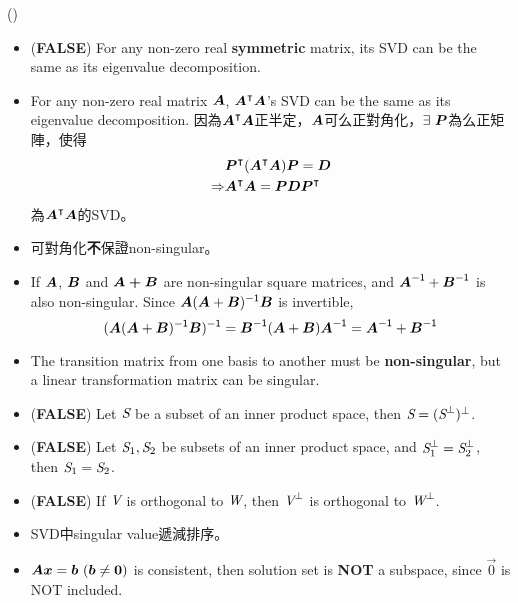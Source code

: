 \item \begin{theorem}{()} \quad\quad \begin{itemize}
        \item (\textbf{FALSE}) For any non-zero real \textbf{symmetric} matrix, its SVD can be the same as its eigenvalue decomposition.
        \item For any non-zero real matrix $\boldsymbol{A}$, $\boldsymbol{A}^\intercal\boldsymbol{A}$'s SVD can be the same as its eigenvalue decomposition. 
        因為$\boldsymbol{A}^\intercal\boldsymbol{A}$正半定，$\boldsymbol{A}$可么正對角化，$\exists \ \boldsymbol{P}$為么正矩陣，使得 \begin{equation}
            \begin{aligned}
                & \boldsymbol{P}^\intercal(\boldsymbol{A}^\intercal\boldsymbol{A})\boldsymbol{P} = \boldsymbol{D} \\
                \Rightarrow & \boldsymbol{A}^\intercal\boldsymbol{A} = \boldsymbol{P}\boldsymbol{D}\boldsymbol{P}^\intercal
            \end{aligned} 
        \end{equation} 為$\boldsymbol{A}^\intercal\boldsymbol{A}$的SVD。
        \item 可對角化\textbf{不}保證non-singular。
        \item If $\boldsymbol{A}$, $\boldsymbol{B}$ and $\boldsymbol{A + B}$ are non-singular square matrices, and $\boldsymbol{A}^{\mathsf{-1}} + \boldsymbol{B}^{\mathsf{-1}}$ is also non-singular.
        Since $\boldsymbol{A}(\boldsymbol{A} + \boldsymbol{B})^{\mathsf{-1}}\boldsymbol{B}$ is invertible, \begin{equation}
            (\boldsymbol{A}(\boldsymbol{A} + \boldsymbol{B})^{\mathsf{-1}}\boldsymbol{B})^{\mathsf{-1}} = \boldsymbol{B}^{\mathsf{-1}}(\boldsymbol{A} + \boldsymbol{B})\boldsymbol{A}^{\mathsf{-1}} = \boldsymbol{A}^{\mathsf{-1}} + \boldsymbol{B}^{\mathsf{-1}}
        \end{equation}
        \item The transition matrix from one basis to another must be \textbf{non-singular}, but a linear transformation matrix can be singular.
        \item (\textbf{FALSE}) Let $\textit{S}$ be a subset of an inner product space, then $\textit{S} = (\textit{S}^{\bot})^{\bot}$.
        \item (\textbf{FALSE}) Let $\textit{S}_1, \textit{S}_2$ be subsets of an inner product space, and $\textit{S}_1^{\bot} = \textit{S}_2^{\bot}$, then $\textit{S}_1 = \textit{S}_2$.
        \item (\textbf{FALSE}) If $\textit{V}$ is orthogonal to $\textit{W}$, then $\textit{V}^\bot$ is orthogonal to $\textit{W}^\bot$.
        \item SVD中singular value遞減排序。
        \item $\boldsymbol{A}\boldsymbol{x} = \boldsymbol{b} \ (\boldsymbol{b} \neq \boldsymbol{0})$ is consistent, then solution set is \textbf{NOT} a subspace, since $\vec{0}$ is NOT included.

\end{itemize}
\end{theorem}
